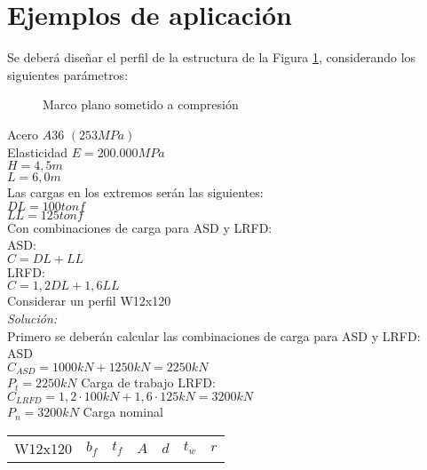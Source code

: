 \section{Ejemplos de aplicación}
\begin{example}
Se deberá diseñar el perfil de la estructura de la Figura \ref{fig:marco1}, considerando los siguientes parámetros:\\
\begin{figure}[h!]
    \centering
    
    \caption{Marco plano sometido a compresión}
    \label{fig:marco1}
\end{figure}
Acero $A36$ $(253 MPa)$\\
Elasticidad $E=200.000 MPa$\\
$H=4,5 m$\\
$L=6,0 m$\\
Las cargas en los extremos serán las siguientes:\\
$DL=100 tonf$\\
$LL=125 tonf$\\
Con combinaciones de carga para ASD y LRFD:\\
ASD:\\
$C=DL+LL$\\
LRFD:\\
$C=1,2DL+1,6LL$\\
\vspace{5mm}
Considerar un perfil W12x120\\
\vspace{5mm}
\textit{Solución:}\\
\vspace{5mm}
Primero se deberán calcular las combinaciones de carga para ASD y LRFD:\\
ASD\\
$C_{ASD}=1000kN+1250kN=2250 kN$\\
$P_{t}=2250kN$ Carga de trabajo
LRFD:\\
$C_{LRFD}=1,2\cdot100kN+1,6\cdot 125kN=3200 kN $\\
$P_{n}=3200kN$ Carga nominal
\begin{table}[h!]
\centering
\begin{tabular}{ccccccc}
\hline
\multirow{2}{*}{W12x120} & $b_f$      & $t_f$      & $A$        & $d$       & $t_w$     & $r$     \\ \cline{2-7} 

\end{tabular}
\end{table}
\end{example}
